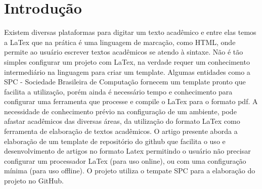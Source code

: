 \section{Introdução}

Existem diversas plataformas para digitar um texto acadêmico e entre elas temos a LaTex que na prática é uma linguagem de marcação, como HTML, onde permite ao usuário escrever textos acadêmicos se atendo à sintaxe. Não é tão simples configurar um projeto com LaTex, na verdade requer um conhecimento intermediário na linguagem para criar um template. Algumas entidades como a SPC - Sociedade Brasileira de Computação fornecem um template pronto que facilita a utilização, porém ainda é necessário tempo e conhecimento para configurar uma ferramenta que processe e compile o LaTex para o formato pdf.
A necessidade de conhecimento prévio na configuração de um ambiente, pode afastar acadêmicos das diversas áreas, da utilização do formato LaTex como ferramenta de elaboração de textos acadêmicos.
O artigo presente aborda a elaboração de um template de repositório do github que facilita o uso e desenvolvimento de artigos no formato Latex permitindo o usuário não precisar configurar um processador LaTex (para uso online), ou com uma configuração mínima (para uso offline).
O projeto utiliza o tempate SPC para a elaboração do projeto no GitHub.